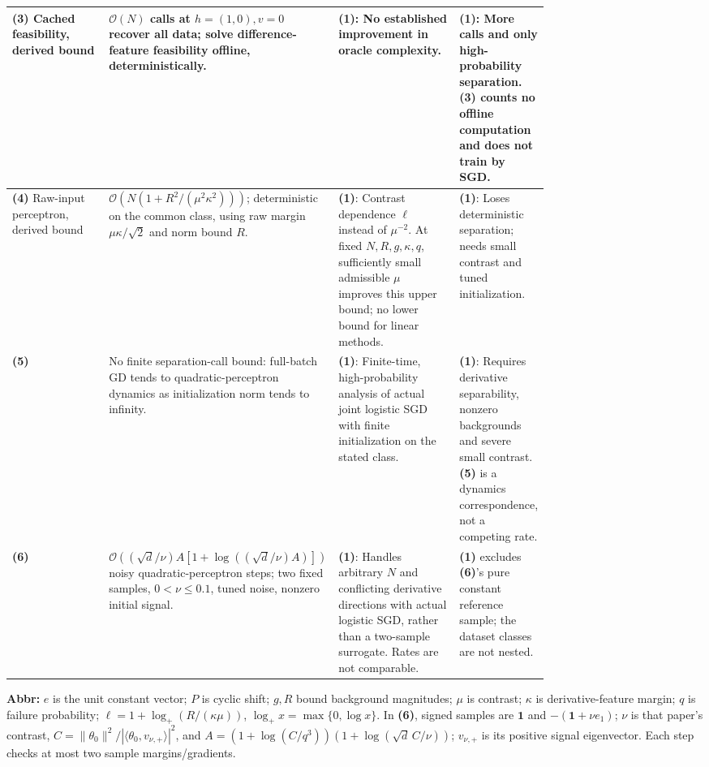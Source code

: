 \begin{table}[tp]
\begin{threeparttable}
\begin{tabularx}{\linewidth}{@{}>{\raggedright\arraybackslash}p{0.20\linewidth}>{\raggedright\arraybackslash}p{0.32\linewidth}>{\raggedright\arraybackslash}p{0.25\linewidth}>{\raggedright\arraybackslash}X@{}}
\midrule
\textbf{(3)} Cached feasibility, derived bound \citep{fscNovikoff1963} & $\mathcal{O}(N)$ calls at $h=(1,0),v=0$ recover all data; solve difference-feature feasibility offline, deterministically. & \textbf{(1)}: No established improvement in oracle complexity. & \textbf{(1)}: More calls and only high-probability separation. \textbf{(3)} counts no offline computation and does not train by SGD. \\
\midrule
\textbf{(4)} Raw-input perceptron, derived bound \citep{fscNovikoff1963} & $\mathcal{O}\!\left(N(1+R^2/(\mu^2\kappa^2))\right)$; deterministic on the common class, using raw margin $\mu\kappa/\sqrt2$ and norm bound $R$. & \textbf{(1)}: Contrast dependence $\ell$ instead of $\mu^{-2}$. At fixed $N,R,g,\kappa,q$, sufficiently small admissible $\mu$ improves this upper bound; no lower bound for linear methods. & \textbf{(1)}: Loses deterministic separation; needs small contrast and tuned initialization. \\
\midrule
\textbf{(5)} \citep[Thm.~2.1]{fscTyurin2026v2} & No finite separation-call bound: full-batch GD tends to quadratic-perceptron dynamics as initialization norm tends to infinity. & \textbf{(1)}: Finite-time, high-probability analysis of actual joint logistic SGD with finite initialization on the stated class. & \textbf{(1)}: Requires derivative separability, nonzero backgrounds and severe small contrast. \textbf{(5)} is a dynamics correspondence, not a competing rate. \\
\midrule
\textbf{(6)} \citep[Thm.~5.1]{fscTyurin2026v2} & $\mathcal{O}\!\left((\sqrt d/\nu)A[1+\log((\sqrt d/\nu)A)]\right)$ noisy quadratic-perceptron steps; two fixed samples, $0<\nu\le0.1$, tuned noise, nonzero initial signal. & \textbf{(1)}: Handles arbitrary $N$ and conflicting derivative directions with actual logistic SGD, rather than a two-sample surrogate. Rates are not comparable. & \textbf{(1)} excludes \textbf{(6)}'s pure constant reference sample; the dataset classes are not nested. \\
\bottomrule
\end{tabularx}
\begin{tablenotes}[flushleft]\footnotesize
\item[] \textbf{Abbr:} $e$ is the unit constant vector; $P$ is cyclic shift; $g,R$ bound background magnitudes; $\mu$ is contrast; $\kappa$ is derivative-feature margin; $q$ is failure probability; $\ell=1+\log_+(R/(\kappa\mu))$, $\log_+x=\max\{0,\log x\}$. In \textbf{(6)}, signed samples are $\mathbf1$ and $-(\mathbf1+\nu e_1)$; $\nu$ is that paper's contrast, $C=\|\theta_0\|^2/|\langle\theta_0,v_{\nu,+}\rangle|^2$, and $A=(1+\log(C/q^3))(1+\log(\sqrt d\,C/\nu))$; $v_{\nu,+}$ is its positive signal eigenvector. Each step checks at most two sample margins/gradients.
\end{tablenotes}
\end{threeparttable}
\end{table}
\clearpage
